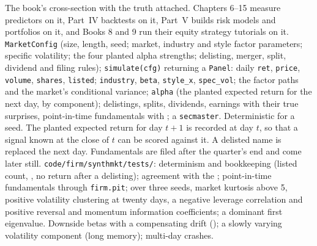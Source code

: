 \begin{build}
 The book's cross-section with the truth attached. Chapters 6--15 measure predictors on it, Part~IV backtests on it,
Part~V builds risk models and portfolios on it, and Books 8 and 9 run their equity strategy tutorials on it.
 \texttt{MarketConfig} (size, length, seed; market, industry and style factor parameters; specific volatility; the
four planted alpha strengths; delisting, merger, split, dividend and filing rules); \texttt{simulate(cfg)} returning a \texttt{Panel}:
daily \texttt{ret}, \texttt{price}, \texttt{volume}, \texttt{shares}, \texttt{listed}; \texttt{industry}, \texttt{beta},
\texttt{style\_x}, \texttt{spec\_vol}; the factor paths and the market's conditional variance; \texttt{alpha} (the planted expected
return for the next day, by component); delistings, splits, dividends, earnings with their true surprises, point-in-time fundamentals
with ; a \texttt{secmaster}.
 Deterministic for a seed. The planted expected return for day $t+1$ is recorded at day $t$, so that a signal known at
the close of $t$ can be scored against it. A delisted name is replaced the next day. Fundamentals are filed after the quarter's end
and  come later still.
 \texttt{code/firm/synthmkt/tests/}: determinism and bookkeeping (listed count, , no return
after a delisting); agreement with the ; point-in-time fundamentals through \texttt{firm.pit}; over three seeds, market
kurtosis above 5, positive volatility clustering at twenty days, a negative leverage correlation and positive reversal and momentum
information coefficients; a dominant first eigenvalue.
 Downside betas with a compensating drift (); a slowly varying volatility component
(long memory); multi-day crashes.
\end{build}

